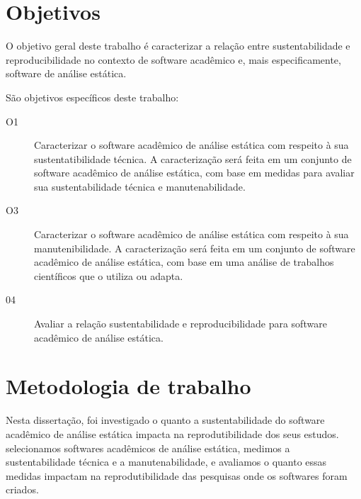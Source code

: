 \section{Objetivos}

O objetivo geral deste trabalho é caracterizar a relação entre sustentabilidade e reproducibilidade no contexto de software acadêmico e, mais especificamente, software de análise estática. 


São objetivos específicos deste trabalho:
\begin{description}
  \item[O1] Caracterizar o software acadêmico de análise estática com respeito à sua sustentatibilidade técnica.
A caracterização será feita em um conjunto de software acadêmico de análise estática, com base em medidas para avaliar
sua sustentabilidade técnica e manutenabilidade.
  \item[O3] Caracterizar o software acadêmico de análise estática com respeito à sua manutenibilidade.
A caracterização será feita em um conjunto de software acadêmico de análise estática, com base em uma análise de trabalhos científicos que o utiliza ou adapta.
  \item[04] Avaliar a relação sustentabilidade e reproducibilidade para software acadêmico de análise estática.
\end{description}

\section{Metodologia de trabalho}

Nesta dissertação, foi investigado o quanto a sustentabilidade do software
acadêmico de análise estática impacta na reprodutibilidade dos seus estudos.
selecionamos softwares acadêmicos de análise estática, medimos a
sustentabilidade técnica e a manutenabilidade, e avaliamos o quanto essas medidas
impactam na reprodutibilidade das pesquisas onde os softwares foram criados.

